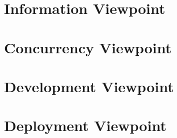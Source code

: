 \section*{Information Viewpoint}

\section*{Concurrency Viewpoint}

\section*{Development Viewpoint}

\section*{Deployment Viewpoint}